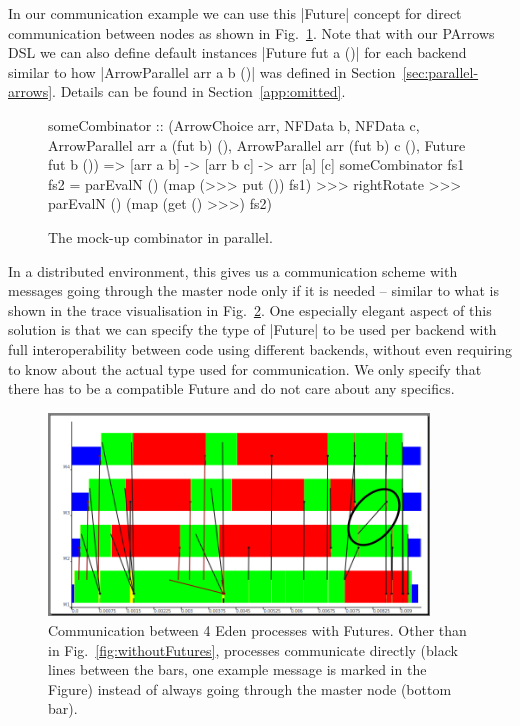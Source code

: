 In our communication example we can use this |Future| concept for direct communication between nodes as shown in Fig.~\ref{fig:someCombinatorParallel}. Note that with our PArrows DSL we can also define default instances |Future fut a ()| for each backend similar to how |ArrowParallel arr a b ()| was defined in Section~\ref{sec:parallel-arrows}. Details can be found in Section~\ref{app:omitted}.
\begin{figure}[tbh]
\begin{code}
someCombinator :: (ArrowChoice arr, NFData b, NFData c,
	ArrowParallel arr a (fut b) (), 
	ArrowParallel arr (fut b) c (),
	Future fut b ()) =>
	[arr a b] -> [arr b c] -> arr [a] [c]
someCombinator fs1 fs2 =
	parEvalN () (map (>>> put ()) fs1) >>>
	rightRotate >>>
	parEvalN () (map (get () >>>) fs2)
\end{code}
\caption{The mock-up combinator in parallel.}
\label{fig:someCombinatorParallel}
\end{figure}
In a distributed environment, this gives us a communication scheme with messages going through the master node only if it is needed -- similar to what is shown in the trace visualisation in Fig.~\ref{fig:withFutures}. One especially elegant aspect of this solution is that we can specify the type of |Future| to be used per backend with full interoperability between code using different backends, without even requiring to know about the actual type used for communication. We only specify that there has to be a compatible Future and do not care about any specifics. 
\begin{figure}[ht]
	\centering
	\includegraphics[width=0.9\textwidth]{images/withFutures}
	\caption[with Futures]{Communication between 4 Eden processes with Futures. Other than in Fig.~\ref{fig:withoutFutures}, processes communicate directly (black lines between the bars, one example message is marked in the Figure) instead of always going through the master node (bottom bar).}
	\label{fig:withFutures}
\end{figure}

